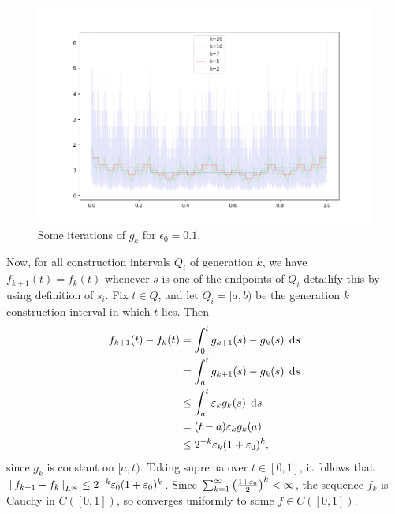 \begin{figure}
    \includegraphics[width=\textwidth]{Figure_3.png}
    
    \caption{Some iterations of $g_k$ for $\epsilon_0 = 0.1$.}
    \label{fig:iterationsOfG}
\end{figure}

Now, for all construction intervals $Q_i$ of generation $k$, we have $f_{k+1}(t) = f_k(t)$ whenever $s$ is one of the endpoints of $Q_i$ {\color{red} detailify this by using definition of $s_i$}. Fix $t \in Q$, and let $Q_i = [a,b)$ be the generation $k$ construction interval in which $t$ lies. Then 
\begin{equation} \begin{aligned}
    f_{k+1}(t) - f_k(t) &= \int_0^t g_{k+1}(s) - g_k(s) \; \operatorname{d}\!{s} \\
                        &= \int_a^t g_{k+1}(s) - g_k(s) \; \operatorname{d}\!{s} \\
                        &\leq \int_a^t \varepsilon_k g_k(s) \; \operatorname{d}\!{s} \\
                        &= (t-a) \varepsilon_k g_k(a) \\
                        &\leq 2^{-k} \varepsilon_k (1 + \varepsilon_0)^k,
\end{aligned} \end{equation}
since $g_k$ is constant on $[a,t)$. Taking suprema over $t \in [0,1]$, it follows that $\left\Vert {f_{k+1} - f_k} \right\Vert_{L^\infty} \leq 2^{-k} \varepsilon_0 (1 + \varepsilon_0)^k$. Since $\sum_{k=1}^\infty \left( {\frac{1+\varepsilon_0}{2}} \right)^k < \infty$, the sequence $f_k$ is Cauchy in $C([0,1])$, so converges uniformly to some $f \in C([0,1])$. 

